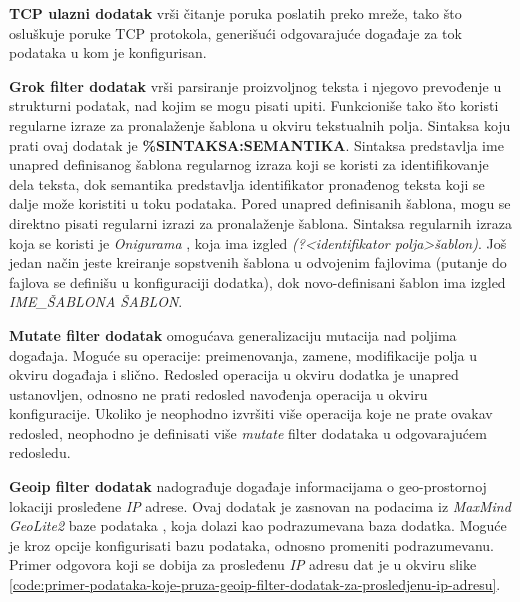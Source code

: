 \par
\textbf{TCP ulazni dodatak} \cite{tcp-plugin} vrši čitanje poruka poslatih preko mreže, tako što osluškuje poruke TCP protokola, generišući odgovarajuće događaje za tok podataka u kom je konfigurisan. 

\par
\textbf{Grok filter dodatak} \cite{grok-plugin} vrši parsiranje proizvoljnog teksta i njegovo prevođenje u strukturni podatak, nad kojim se mogu pisati upiti. Funkcioniše tako što koristi regularne izraze za pronalaženje šablona u okviru tekstualnih polja. Sintaksa koju prati ovaj dodatak je \textbf{\%{SINTAKSA:SEMANTIKA}}. Sintaksa predstavlja ime unapred definisanog šablona regularnog izraza koji se koristi za identifikovanje dela teksta, dok semantika predstavlja identifikator pronađenog teksta koji se dalje može koristiti u toku podataka. Pored unapred definisanih šablona, mogu se direktno pisati regularni izrazi za pronalaženje šablona. Sintaksa regularnih izraza koja se koristi je \textit{Onigurama} \cite{onigurama}, koja ima izgled \textit{(?<identifikator polja>šablon)}. Još jedan način jeste kreiranje sopstvenih šablona u odvojenim fajlovima (putanje do fajlova se definišu u konfiguraciji dodatka), dok novo-definisani šablon ima izgled \textit{IME\_ŠABLONA ŠABLON}.

\par
\textbf{Mutate filter dodatak} \cite{mutate-plugin} omogućava generalizaciju mutacija nad poljima događaja. Moguće su operacije: preimenovanja, zamene, modifikacije polja u okviru događaja i slično. Redosled operacija u okviru dodatka je unapred ustanovljen, odnosno ne prati redosled navođenja operacija u okviru konfiguracije. Ukoliko je neophodno izvršiti više operacija koje ne prate ovakav redosled, neophodno je definisati više \textit{mutate} filter dodataka u odgovarajućem redosledu. 

\par
\textbf{Geoip filter dodatak} \cite{geoip-plugin} nadograđuje događaje informacijama o geo-prostornoj lokaciji prosleđene \textit{IP} adrese. Ovaj dodatak je zasnovan na podacima iz \textit{MaxMind GeoLite2} baze podataka \cite{maxmind-geolite}, koja dolazi kao podrazumevana baza dodatka. Moguće je kroz opcije konfigurisati bazu podataka, odnosno promeniti podrazumevanu. Primer odgovora koji se dobija za prosleđenu \textit{IP} adresu dat je u okviru slike \ref{code:primer-podataka-koje-pruza-geoip-filter-dodatak-za-prosledjenu-ip-adresu}.


